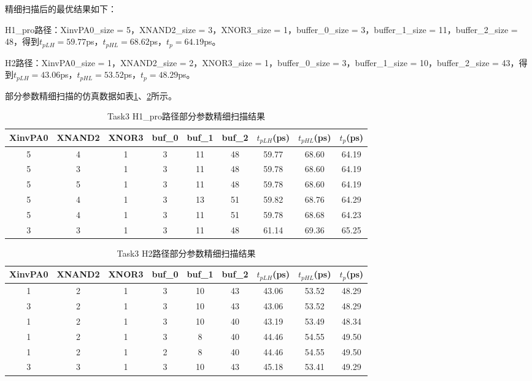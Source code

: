 \documentclass[UTF8,12pt,a4paper]{ctexart}
\begin{document}
精细扫描后的最优结果如下：

H1\_pro路径：XinvPA0\_size = 5，XNAND2\_size = 3，XNOR3\_size = 1，buffer\_0\_size = 3，buffer\_1\_size = 11，buffer\_2\_size = 48，得到$t_{pLH} = 59.77$ps，$t_{pHL} = 68.62$ps，$t_p = 64.19$ps。

H2路径：XinvPA0\_size = 1，XNAND2\_size = 2，XNOR3\_size = 1，buffer\_0\_size = 3，buffer\_1\_size = 10，buffer\_2\_size = 43，得到$t_{pLH} = 43.06$ps，$t_{pHL} = 53.52$ps，$t_p = 48.29$ps。

部分参数精细扫描的仿真数据如表\ref{tab:task3_h1pro_data}、\ref{tab:task3_h2_data}所示。

\begin{table}[htbp]
\centering
\caption{Task3 H1\_pro路径部分参数精细扫描结果}
\label{tab:task3_h1pro_data}
\begin{tabular}{ccccccccc}
\toprule
XinvPA0 & XNAND2 & XNOR3 & buf\_0 & buf\_1 & buf\_2 & $t_{pLH}$(ps) & $t_{pHL}$(ps) & $t_p$(ps) \\
\midrule
5 & 4 & 1 & 3 & 11 & 48 & 59.77 & 68.60 & 64.19 \\
5 & 3 & 1 & 3 & 11 & 48 & 59.78 & 68.60 & 64.19 \\
5 & 5 & 1 & 3 & 11 & 48 & 59.78 & 68.60 & 64.19 \\
5 & 4 & 1 & 3 & 13 & 51 & 59.82 & 68.76 & 64.29 \\
5 & 4 & 1 & 3 & 11 & 51 & 59.78 & 68.68 & 64.23 \\
3 & 3 & 1 & 3 & 11 & 48 & 61.14 & 69.36 & 65.25 \\
\bottomrule
\end{tabular}
\end{table}

\begin{table}[htbp]
\centering
\caption{Task3 H2路径部分参数精细扫描结果}
\label{tab:task3_h2_data}
\begin{tabular}{ccccccccc}
\toprule
XinvPA0 & XNAND2 & XNOR3 & buf\_0 & buf\_1 & buf\_2 & $t_{pLH}$(ps) & $t_{pHL}$(ps) & $t_p$(ps) \\
\midrule
1 & 2 & 1 & 3 & 10 & 43 & 43.06 & 53.52 & 48.29 \\
3 & 2 & 1 & 3 & 10 & 43 & 43.06 & 53.52 & 48.29 \\
1 & 2 & 1 & 3 & 10 & 40 & 43.19 & 53.49 & 48.34 \\
1 & 2 & 1 & 3 & 8 & 40 & 44.46 & 54.55 & 49.50 \\
1 & 2 & 1 & 2 & 8 & 40 & 44.46 & 54.55 & 49.50 \\
3 & 3 & 1 & 3 & 10 & 43 & 45.18 & 53.41 & 49.29 \\
\bottomrule
\end{tabular}
\end{table}
\end{document}
